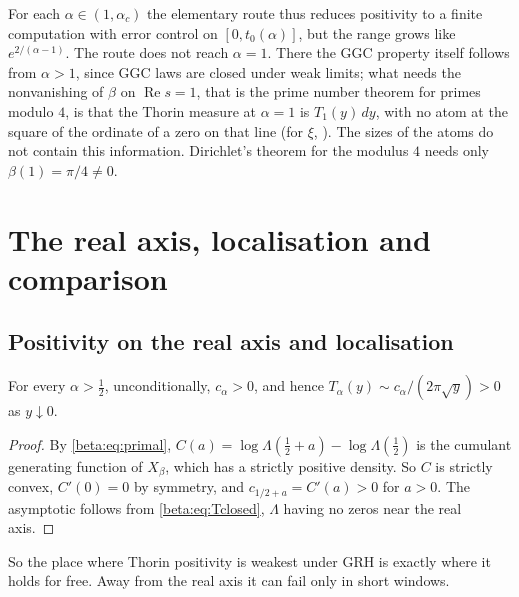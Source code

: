 \noindent For each $\alpha\in(1,\alpha_c)$ the elementary route thus reduces positivity to a finite computation with error control on $[0,t_0(\alpha)]$, but the range grows like $e^{2/(\alpha-1)}$. The route does not reach $\alpha=1$. There the GGC property itself follows from $\alpha>1$, since GGC laws are closed under weak limits; what needs the nonvanishing of $\beta$ on $\operatorname{Re}s=1$, that is the prime number theorem for primes modulo $4$, is that the Thorin measure at $\alpha=1$ is $T_1(y)\,dy$, with no atom at the square of the ordinate of a zero on that line (for $\xi$, \cite[Remark~21]{polson2018vdp}). The sizes of the atoms do not contain this information. Dirichlet's theorem for the modulus $4$ needs only $\beta(1)=\pi/4\ne0$.


\section{The real axis, localisation and comparison}\label{beta:sec:axis}

\subsection{Positivity on the real axis and localisation}

\begin{theorem}\label{beta:thm:realaxis}
For every $\alpha>\tfrac12$, unconditionally, $c_\alpha>0$, and hence $T_\alpha(y)\sim c_\alpha/(2\pi\sqrt y)>0$ as $y\downarrow0$.
\end{theorem}

\begin{proof}
By \eqref{beta:eq:primal}, $C(a)=\log\Lambda(\tfrac12+a)-\log\Lambda(\tfrac12)$ is the cumulant generating function of $X_\beta$, which has a strictly positive density. So $C$ is strictly convex, $C'(0)=0$ by symmetry, and $c_{1/2+a}=C'(a)>0$ for $a>0$. The asymptotic follows from \eqref{beta:eq:Tclosed}, $\Lambda$ having no zeros near the real axis.
\end{proof}

So the place where Thorin positivity is weakest under GRH is exactly where it holds for free. Away from the real axis it can fail only in short windows.

